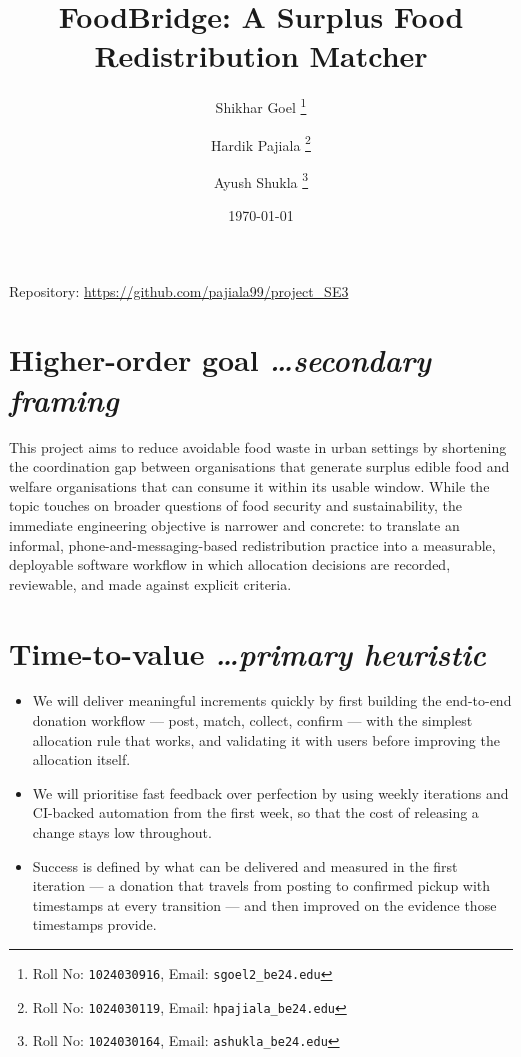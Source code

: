 \documentclass[11pt,a4paper]{article}
\title{FoodBridge: A Surplus Food Redistribution Matcher}
\author{
  Shikhar Goel%
  \thanks{Roll No: \texttt{1024030916}, %
    Email: \texttt{sgoel2\_be24\@thapar.edu}}
  \and
  Hardik Pajiala%
  \thanks{Roll No: \texttt{1024030119}, %
    Email: \texttt{hpajiala\_be24\@thapar.edu}}
  \and
  Ayush Shukla%
  \thanks{Roll No: \texttt{1024030164}, %
    Email: \texttt{ashukla\_be24\@thapar.edu}}
}
\date{\today}
\newcommand{\BvrHint}[1]{%
  {\normalfont\normalsize\itshape\hfill #1}}
\begin{document}
\maketitle

\begin{center}
  Repository: \url{https://github.com/pajiala99/project_SE3}
\end{center}

\section{Higher-order goal%
  \BvrHint{\ldots secondary framing}}
This project aims to reduce avoidable food waste in urban settings by
shortening the coordination gap between organisations that generate
surplus edible food and welfare organisations that can consume it
within its usable window. While the topic touches on broader questions
of food security and sustainability, the immediate engineering
objective is narrower and concrete: to translate an informal,
phone-and-messaging-based redistribution practice into a measurable,
deployable software workflow in which allocation decisions are
recorded, reviewable, and made against explicit criteria.

\section{Time-to-value %
\BvrHint{\ldots primary heuristic}}
\begin{itemize}[leftmargin=0.7cm]
    \item We will deliver meaningful increments quickly by first building the end-to-end donation workflow --- post, match, collect, confirm --- with the simplest allocation rule that works, and validating it with users before improving the allocation itself.
    \item We will prioritise fast feedback over perfection by using weekly iterations and CI-backed automation from the first week, so that the cost of releasing a change stays low throughout.
    \item Success is defined by what can be delivered and measured in the first iteration --- a donation that travels from posting to confirmed pickup with timestamps at every transition --- and then improved on the evidence those timestamps provide.
\end{itemize}
\end{document}
